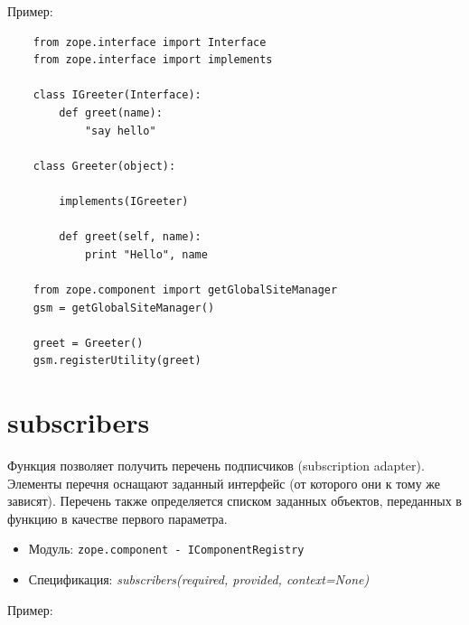 \documentclass[a4paper,openany,twoside,final]{book}
\providecommand*{\DUroletitlereference}[1]{\textsl{#1}}
\begin{document}
Пример:

\begin{verbatim}
    from zope.interface import Interface
    from zope.interface import implements

    class IGreeter(Interface):
        def greet(name):
            "say hello"

    class Greeter(object):

        implements(IGreeter)

        def greet(self, name):
            print "Hello", name

    from zope.component import getGlobalSiteManager
    gsm = getGlobalSiteManager()

    greet = Greeter()
    gsm.registerUtility(greet)
\end{verbatim}


\section*{subscribers%
  \label{subscribers}%
}

Функция позволяет получить перечень подписчиков (subscription adapter).  Элементы перечня оснащают заданный интерфейс (от которого они к тому же зависят).  Перечень также определяется списком заданных объектов, переданных в функцию в качестве первого параметра.

\begin{itemize}

\item Модуль: \texttt{zope.component - IComponentRegistry}

\item Спецификация: \DUroletitlereference{subscribers(required, provided, context=None)}

\end{itemize}

Пример:
\end{document}
